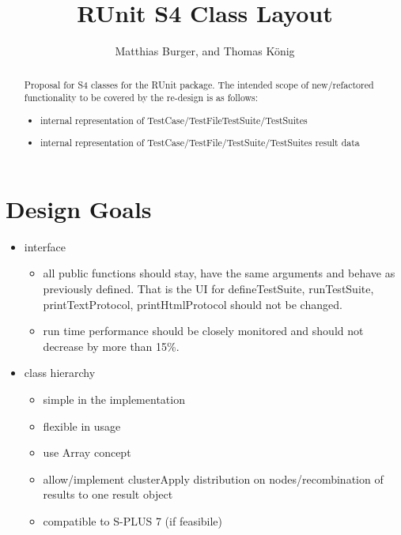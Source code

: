 \documentclass[a4paper,10pt]{article}
\title{RUnit S4 Class Layout}
\author{Matthias Burger, and Thomas K\"onig}
\begin{document}
\maketitle

\begin{abstract}
Proposal for S4 classes for the RUnit package.
The intended scope of new/refactored functionality to be covered by the re-design is as
follows:
\begin{itemize}
\item internal representation of TestCase/TestFileTestSuite/TestSuites 
\item internal representation of
      TestCase/TestFile/TestSuite/TestSuites result data
\end{itemize}
\end{abstract}

\tableofcontents

\section{Design Goals}

\begin{itemize}

\item interface
\begin{itemize}
\item all public functions should stay, have the same arguments and
      behave as previously defined. That is the UI for defineTestSuite,
      runTestSuite, printTextProtocol, printHtmlProtocol should not be
      changed.
\item run time performance should be closely monitored and should not
      decrease by more than 15\%.
\end{itemize}

\item class hierarchy
\begin{itemize}
\item simple in the implementation
\item flexible in usage
\item use Array concept
\item allow/implement clusterApply distribution on nodes/recombination
      of results to one result object
\item compatible to S-PLUS 7 (if feasibile)
\end{itemize}

\end{itemize}
\end{document}
